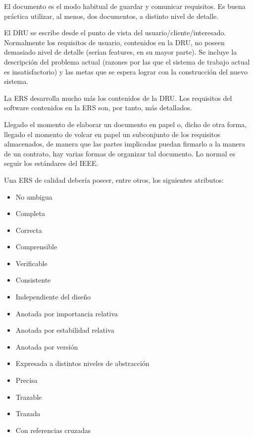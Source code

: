 El documento es el modo habitual de guardar y comunicar requisitos. Es
buena práctica utilizar, al menos, dos documentos, a distinto nivel de
detalle.

\begin{description}[noitemsep]
\item[DRU, Documento de Requisitos de Usuario (URD)] El DRU se escribe
  desde el punto de vista del usuario/cliente/interesado. Normalmente
  los requisitos de usuario, contenidos en la DRU, no poseen demasiado
  nivel de detalle (serían features, en su mayor parte). Se incluye la
  descripción del problema actual (razones por las que el sistema de
  trabajo actual es insatisfactorio) y las metas que se espera lograr
  con la construcción del nuevo sistema.
\item[ERS, Especificación de Requisitos de Software (SRS)] La ERS
  desarrolla mucho más los contenidos de la DRU. Los requisitos del
  software contenidos en la ERS son, por tanto, más detallados.
\end{description}

Llegado el momento de elaborar un documento en papel o, dicho de otra
forma, llegado el momento de volcar en papel un subconjunto de los
requisitos almacenados, de manera que las partes implicadas puedan
firmarlo a la manera de un contrato, hay varias formas de organizar
tal documento. Lo normal es seguir los estándares del IEEE.

Una ERS de calidad debería poseer, entre otros, los siguientes atributos:

\begin{itemize}[noitemsep]
\item No ambigua
\item Completa
\item Correcta
\item Comprensible
\item Verificable
\item Consistente
\item Independiente del diseño
\item Anotada por importancia relativa
\item Anotada por estabilidad relativa
\item Anotada por versión
\item Expresada a distintos niveles de abstracción
\item Precisa
\item Trazable
\item Trazada
\item Con referencias cruzadas
\end{itemize}

